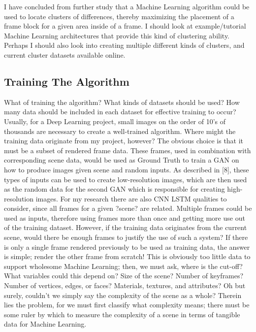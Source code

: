 \documentclass[conference]{IEEEtran}
\begin{document}
I have concluded from further study that a Machine Learning algorithm could be used to locate clusters of differences,
thereby maximizing the placement of a frame block for a given area inside of a frame.
I should look at example/tutorial Machine Learning architectures that provide this kind of clustering ability.
Perhaps I should also look into creating multiple different kinds of clusters, and current cluster datasets available online.

\subsection{Training The Algorithm}
\label{subsec:training_the_algorithm}
What of training the algorithm? What kinds of datasets should be used?
How many data should be included in each dataset for effective training to occur?
Usually, for a Deep Learning project, small images on the order of 10's of thousands are necessary to create a well-trained algorithm.
Where might the training data originate from my project, however?
The obvious choice is that it must be a subset of rendered frame data.
These frames, used in combination with corresponding scene data,
would be used as Ground Truth to train a GAN on how to produce images given scene and random inputs.
As described in [8], these types of inputs can be used to create low-resolution images,
which are then used as the random data for the second GAN which is responsible for creating high-resolution images.
For my research there are also CNN LSTM qualities to consider,
since all frames for a given ?scene? are related.
Multiple frames could be used as inputs,
therefore using frames more than once and getting more use out of the training dataset.
However, if the training data originates from the current scene,
would there be enough frames to justify the use of such a system?
If there is only a single frame rendered previously to be used as training data, the answer is simple;
render the other frame from scratch! This is obviously too little data to support wholesome Machine Learning;
then, we must ask, where is the cut-off? What variables could this depend on?
Size of the scene? Number of keyframes? Number of vertices, edges, or faces?
Materials, textures, and attributes? Oh but surely,
couldn't we simply say the complexity of the scene as a whole?
Therein lies the problem, for we must first classify what complexity means;
there must be some ruler by which to measure the complexity of a scene in terms of tangible data for Machine Learning.
\end{document}
